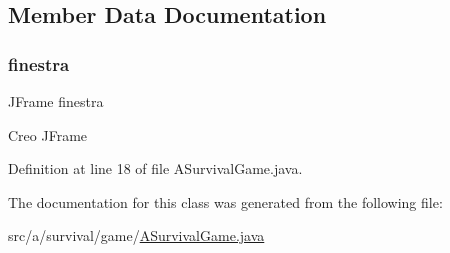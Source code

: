 \subsection{Member Data Documentation}
\mbox{\label{classa_1_1survival_1_1game_1_1_a_survival_game_a2566c4e674dd7ca4c0f6d0097845f6a6}} 
\subsubsection{\texorpdfstring{finestra}{finestra}}
{\footnotesize\ttfamily J\+Frame finestra\hspace{0.3cm}{\ttfamily [static]}}

Creo J\+Frame 

Definition at line 18 of file A\+Survival\+Game.\+java.



The documentation for this class was generated from the following file\+:\begin{DoxyCompactItemize}
\item 
src/a/survival/game/\hyperlink{_a_survival_game_8java}{A\+Survival\+Game.\+java}\end{DoxyCompactItemize}
